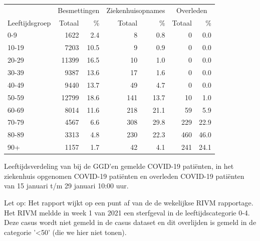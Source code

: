 \documentclass[
  english,
  man,floatsintext]{apa6}
\begin{document}
\begin{table}[H]
\centering\begingroup\fontsize{11}{13}\selectfont

\begin{threeparttable}
\begin{tabular}{lrrrrrr}
\toprule
\multicolumn{1}{c}{ } & \multicolumn{2}{c}{Besmettingen} & \multicolumn{2}{c}{Ziekenhuisopnames} & \multicolumn{2}{c}{Overleden} \\
\cmidrule(l{3pt}r{3pt}){2-3} \cmidrule(l{3pt}r{3pt}){4-5} \cmidrule(l{3pt}r{3pt}){6-7}
Leeftijdsgroep & Totaal & \% & Totaal & \% & Totaal & \%\\
\midrule
0-9 & 1622 & 2.4 & 8 & 0.8 & 0 & 0.0\\
10-19 & 7203 & 10.5 & 9 & 0.9 & 0 & 0.0\\
20-29 & 11399 & 16.5 & 10 & 1.0 & 0 & 0.0\\
30-39 & 9387 & 13.6 & 17 & 1.6 & 0 & 0.0\\
40-49 & 9440 & 13.7 & 49 & 4.7 & 0 & 0.0\\
50-59 & 12799 & 18.6 & 141 & 13.7 & 10 & 1.0\\
60-69 & 8014 & 11.6 & 218 & 21.1 & 59 & 5.9\\
70-79 & 4567 & 6.6 & 308 & 29.8 & 229 & 22.9\\
80-89 & 3313 & 4.8 & 230 & 22.3 & 460 & 46.0\\
90+ & 1157 & 1.7 & 42 & 4.1 & 241 & 24.1\\
\bottomrule
\end{tabular}
\begin{tablenotes}
\item[1] Leeftijdsverdeling van bij de GGD’en gemelde COVID-19 patiënten, in het ziekenhuis opgenomen COVID-19 patiënten en overleden COVID-19 patiënten van 15 januari t/m 29 januari 10:00 uur.
\item[2] Let op: Het rapport wijkt op een punt af van de de wekelijkse RIVM rapportage. Het RIVM meldde in week 1 van 2021 een sterfgeval in de leeftijdscategorie 0-4. Deze casus wordt niet gemeld in de casus dataset en dit overlijden is gemeld in de categorie '<50' (die we hier niet tonen).
\end{tablenotes}
\end{threeparttable}
\endgroup{}
\end{table}

\newpage
\end{document}
